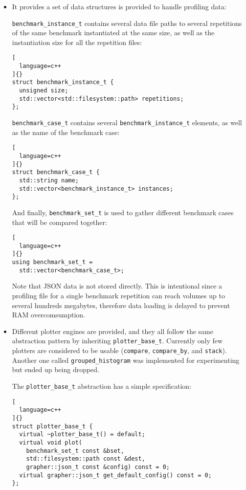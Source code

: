 \documentclass[../main]{subfiles}
\begin{document}
\begin{itemize}
\item

  It provides a set of data structures is provided to handle profiling data:

  \lstinline{benchmark_instance_t} contains several data file paths to several
  repetitions of the same benchmark instantiated at the same size, as well
  as the instantiation size for all the repetition files:

\begin{lstlisting}[
  language=c++
]{}
struct benchmark_instance_t {
  unsigned size;
  std::vector<std::filesystem::path> repetitions;
};
\end{lstlisting}

  \lstinline{benchmark_case_t} contains several \lstinline{benchmark_instance_t}
  elements, as well as the name of the benchmark case:

\begin{lstlisting}[
  language=c++
]{}
struct benchmark_case_t {
  std::string name;
  std::vector<benchmark_instance_t> instances;
};
\end{lstlisting}

  And finally, \lstinline{benchmark_set_t} is used to gather
  different benchmark cases that will be compared together:

\begin{lstlisting}[
  language=c++
]{}
using benchmark_set_t =
  std::vector<benchmark_case_t>;
\end{lstlisting}

  Note that JSON data is not stored directly.
  This is intentional since a profiling file for a single benchmark repetition
  can reach volumes up to several hundreds megabytes, therefore data loading
  is delayed to prevent RAM overcomsumption.

\item

  Different plotter engines are provided, and they all follow the same
  abstraction pattern by inheriting \lstinline{plotter_base_t}.
  Currently only few plotters are considered to be usable
  (\lstinline{compare}, \lstinline{compare_by}, and \lstinline{stack}).
  Another one called \lstinline{grouped_histogram} was implemented
  for experimenting but ended up being dropped.

  The \lstinline{plotter_base_t} abstraction has a simple specification:
\begin{lstlisting}[
  language=c++
]{}
struct plotter_base_t {
  virtual ~plotter_base_t() = default;
  virtual void plot(
    benchmark_set_t const &bset,
    std::filesystem::path const &dest,
    grapher::json_t const &config) const = 0;
  virtual grapher::json_t get_default_config() const = 0;
};
\end{lstlisting}


\end{itemize}
\end{document}
